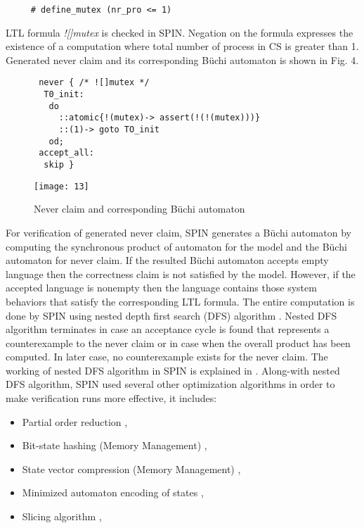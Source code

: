 \documentclass[conference]{IEEEtran}
\begin{document}
\begin{verbatim}
     # define_mutex (nr_pro <= 1)
\end{verbatim}

LTL formula \emph{![]mutex} is checked in SPIN. Negation on the formula expresses the existence of a computation where total number of process in CS is 
greater than 1. Generated never claim and its corresponding B\"uchi automaton is shown in Fig. 4.

\begin{figure}[!ht]
{\small \begin{verbatim}
 never { /* ![]mutex */
  T0_init:
   do
     ::atomic{!(mutex)-> assert(!(!(mutex)))}
     ::(1)-> goto TO_init
   od;
 accept_all:
  skip }
\end{verbatim}}\vspace{-5mm}
\centering\texttt{[image: 13]}
\caption{Never claim and corresponding B\"uchi automaton} 
\end{figure}

For verification of generated never claim, SPIN generates a Büchi automaton by computing the synchronous product of automaton for the model 
and the B\"uchi automaton for never claim. If the resulted B\"uchi automaton accepts empty language then the correctness claim is not 
satisfied by the model. However, if the accepted language is nonempty then the language contains those system behaviors that satisfy the 
corresponding LTL formula. The entire computation is done by SPIN using nested depth first search (DFS) algorithm \cite{25}. Nested DFS algorithm 
terminates in case an acceptance cycle is found that represents a counterexample to the never claim or in case when the overall product has been
computed. In later case, no counterexample exists for the never claim. The working of nested DFS algorithm in SPIN is explained in \cite{26}. 
Along-with nested DFS algorithm, SPIN used several other optimization algorithms in order to make verification runs more effective, it includes:
\begin{itemize}
 \item Partial order reduction \cite{27},
 \item Bit-state hashing (Memory Management) \cite{28},
 \item State vector compression (Memory Management) \cite{29},
 \item Minimized automaton encoding of states \cite{30},
 \item Slicing algorithm \cite{31},
\end{itemize}
\end{document}
